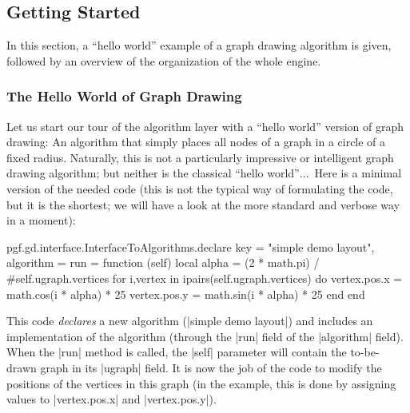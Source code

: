 \subsection{Getting Started}

In this section, a ``hello world'' example of a graph drawing algorithm  is
given, followed by an overview of the organization of the whole engine.


\subsubsection{The Hello World of Graph Drawing}

Let us start our tour of the algorithm layer with a ``hello world'' version of
graph drawing: An algorithm that simply places all nodes of a graph in a circle
of a fixed radius. Naturally, this is not a particularly impressive or
intelligent graph drawing algorithm; but neither is the classical ``hello
world''$\dots$\ Here is a minimal version of the needed code (this is not the
typical way of formulating the code, but it is the shortest; we will have a
look at the more standard and verbose way in a moment):
%
\begin{codeexample}[code only, tikz syntax=false]
pgf.gd.interface.InterfaceToAlgorithms.declare {
  key = "simple demo layout",
  algorithm = {
    run =
      function (self)
        local alpha = (2 * math.pi) / #self.ugraph.vertices
        for i,vertex in ipairs(self.ugraph.vertices) do
          vertex.pos.x = math.cos(i * alpha) * 25
          vertex.pos.y = math.sin(i * alpha) * 25
        end
      end
  }
}
\end{codeexample}

This code \emph {declares} a new algorithm (|simple demo layout|) and
includes an implementation of the algorithm (through the |run| field of the
|algorithm| field). When the |run| method is called, the |self| parameter will
contain the to-be-drawn graph in its |ugraph| field. It is now the job of the
code to modify the positions of the vertices in this graph (in the example,
this is done by assigning values to |vertex.pos.x| and |vertex.pos.y|).


